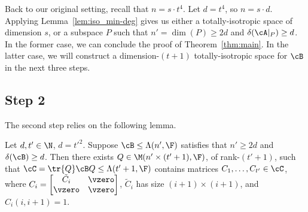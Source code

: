 Back to our original setting, recall that $n=s\cdot t^4$. Let $d=t^4$, so 
$n=s\cdot d$. Applying Lemma~\ref{lem:iso_min-deg} gives us 
either 
a totally-isotropic 
space of 
dimension $s$, or a subspace $P$ such that $n'=\dim(P)\geq 2d$ and 
$\delta(\cA|_P)\geq d$. In the former case, we can conclude the proof of 
Theorem~\ref{thm:main}. 
In the latter case, we will construct a 
dimension-$(t+1)$ totally-isotropic space for $\cB$ in the next three steps. 


%
%
%
%
%



\subsection{Step 2}  The second step relies on the following lemma.

\begin{lemma}\label{lem:step2}
Let $d, t'\in \N$, $d=t'^2$. Suppose $\cB\leq\Lambda(n', \F)$ satisfies that 
$n'\geq 2d$ and $\delta(\cB)\geq d$. Then there exists $Q\in \M(n'\times (t'+1), 
\F)$, of rank-$(t'+1)$, such that $\cC=\tr{Q}\cB 
Q\leq 
\Lambda(t'+1, \F)$ contains matrices $C_1, \dots, C_{t'}\in \cC$, where
$C_i=\begin{bmatrix}
\tilde C_i & \vzero \\
\vzero & \vzero 
\end{bmatrix}$, $\tilde C_i$ has size $(i+1)\times (i+1)$, and $C_i(i, 
i+1)=1$.
\end{lemma}
